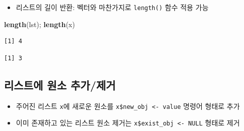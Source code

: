 \documentclass[
  11pt,
]{krantz}
\newenvironment{Shaded}{\begin{snugshade}}{\end{snugshade}}
\newcommand{\CommentTok}[1]{\textcolor[rgb]{0.37,0.37,0.37}{\textit{#1}}}
\newcommand{\DecValTok}[1]{\textcolor[rgb]{0.06,0.06,0.06}{#1}}
\newcommand{\KeywordTok}[1]{\textcolor[rgb]{0.27,0.27,0.27}{\textbf{#1}}}
\newcommand{\NormalTok}[1]{#1}
\newcommand{\OperatorTok}[1]{\textcolor[rgb]{0.43,0.43,0.43}{\textbf{#1}}}
\newcommand{\OtherTok}[1]{\textcolor[rgb]{0.37,0.37,0.37}{#1}}
\newcommand{\StringTok}[1]{\textcolor[rgb]{0.5,0.5,0.5}{#1}}
\providecommand{\tightlist}{%
  \setlength{\itemsep}{0pt}\setlength{\parskip}{0pt}}
\begin{document}
\normalsize

\begin{itemize}
\tightlist
\item
  리스트의 길이 반환: 벡터와 마찬가지로 \texttt{length()} 함수 적용 가능
\end{itemize}

\footnotesize

\begin{Shaded}
\begin{Highlighting}[]
\KeywordTok{length}\NormalTok{(lst); }\KeywordTok{length}\NormalTok{(x)}
\end{Highlighting}
\end{Shaded}

\begin{verbatim}
[1] 4
\end{verbatim}

\begin{verbatim}
[1] 3
\end{verbatim}

\normalsize

\hypertarget{list-add-delete}{%
\subsection{리스트에 원소 추가/제거}\label{list-add-delete}}

\begin{itemize}
\tightlist
\item
  주어진 리스트 \texttt{x}에 새로운 원소를 \texttt{x\$new\_obj\ \textless{}-\ value} 명령어 형태로 추가
\item
  이미 존재하고 있는 리스트 원소 제거는 \texttt{x\$exist\_obj\ \textless{}-\ NULL} 형태로 제거
\end{itemize}

\footnotesize

\begin{Shaded}
\end{Shaded}
\end{document}
